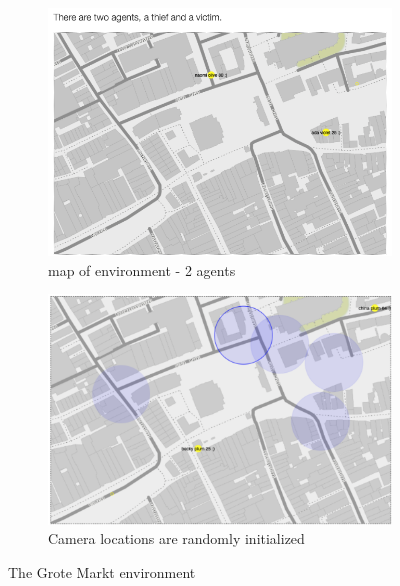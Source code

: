 \begin{figure}[htbp]
\begin{center}
\begin{subfigure}{.5\textwidth}
\includegraphics[width=\linewidth]{images/grotemarktmap.png}
\caption{map of environment - 2 agents}
\end{subfigure}%
\begin{subfigure}{.5\textwidth}
\includegraphics[width=\linewidth]{images/agentGM.png}
\caption{Camera locations are randomly initialized}
\end{subfigure}%
\label{groteMarkt}
\caption{The Grote Markt environment}
\end{center}
\end{figure}






